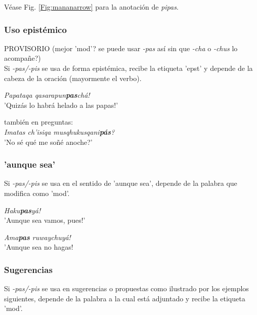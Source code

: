 \documentclass[a4paper,11pt,DIV12]{scrartcl}
\begin{document}
V\'ease Fig. \ref{Fig:mananarrow} para la anotaci\'on de {\em pipas}.
\subsubsection{Uso epist\'emico}
PROVISORIO (mejor 'mod'? se puede usar {\em -pas} as\'i sin que {\em -cha} o {\em -chus} lo acompa\~ne?)\\
Si {\em -pas/-pis} se usa de forma epist\'emica, recibe la etiqueta 'epst' y depende de la cabeza de la oraci\'on (mayormente el verbo). 

\begin{examples}
 \item {\em Papataqa qasarapun\textbf{pas}ch\'a!}\\
       '{\textexclamdown}Quiz\'as lo habr\'a helado a las papas!'
 \item tambi\'en en preguntas:\\
      {\em Imatas ch'isiqa musqhukusqani\textbf{p\'as}?}\\
      '{\textquestiondown}No s\'e qu\'e me so\~n\'e anoche?'\\
  		\hfill{\small \citep[239]{Cusi2}}
\end{examples}

\subsubsection{'aunque sea'}

Si {\em -pas/-pis} se usa en el sentido de 'aunque sea', depende de la palabra que modifica como 'mod'.

\begin{examples}
 \item {\em Haku\textbf{pas}y\'a!}\\
      '{\textexclamdown}Aunque sea vamos, pues!'
  \item {\em Ama\textbf{pas} ruwaychuy\'a!}\\
      '{\textexclamdown}Aunque sea no hagas!\\
  		\hfill{\small \citep[240]{Cusi2}}
\end{examples}

\subsubsection{Sugerencias}

Si {\em -pas/-pis} se usa en sugerencias o propuestas como ilustrado por los ejemplos siguientes, depende de la palabra a la cual est\'a adjuntado y recibe la etiqueta 'mod'.
\end{document}
